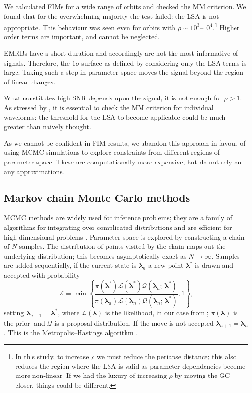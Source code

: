 We calculated FIMs for a wide range of orbits and checked the MM criterion. We found that for the overwhelming majority the test failed: the LSA is not appropriate. This behaviour was seen even for orbits with $\rho \sim 10^3$--$10^4$.\footnote{In this study, to increase $\rho$ we must reduce the periapse distance; this also reduces the region where the LSA is valid as parameter dependencies become more non-linear. If we had the luxury of increasing $\rho$ by moving the GC closer, things could be different.} Higher order terms are important, and cannot be neglected.

EMRBs have a short duration and accordingly are not the most informative of signals. Therefore, the $1\sigma$ surface as defined by considering only the LSA terms is large. Taking such a step in parameter space moves the signal beyond the region of linear changes.

What constitutes high SNR depends upon the signal; it is not enough for $\rho > 1$. As stressed by \citet{Vallisneri2008}, it is essential to check the MM criterion for individual waveforms: the threshold for the LSA to become applicable could be much greater than naively thought.

As we cannot be confident in FIM results, we abandon this approach in favour of using MCMC simulations to explore constraints from different regions of parameter space. These are computationally more expensive, but do not rely on any approximations.

\subsection{Markov chain Monte Carlo methods}\label{sec:MCMC}

MCMC methods are widely used for inference problems; they are a family of algorithms for integrating over complicated distributions and are efficient for high-dimensional problems \citep[chapter 29]{MacKay2003}. Parameter space is explored by constructing a chain of $N$ samples. The distribution of points visited by the chain maps out the underlying distribution; this becomes asymptotically exact as $N \rightarrow \infty$. Samples are added sequentially, if the current state is $\boldsymbol{\lambda}_n$ a new point $\boldsymbol{\lambda}^\ast$ is drawn and accepted with probability
\begin{equation}
\mathcal{A} = \min\left\{\dfrac{\pi(\boldsymbol{\lambda}^\ast)\mathcal{L}(\boldsymbol{\lambda}^\ast)\mathcal{Q}(\boldsymbol{\lambda}_n;\,\boldsymbol{\lambda}^\ast)}{\pi(\boldsymbol{\lambda}_n)\mathcal{L}(\boldsymbol{\lambda}_n)\mathcal{Q}(\boldsymbol{\lambda}_n;\,\boldsymbol{\lambda}^\ast)}, 1\right\},
\end{equation}
setting $\boldsymbol{\lambda}_{n + 1} = \boldsymbol{\lambda}^\ast$, where $\mathcal{L}(\boldsymbol{\lambda})$ is the likelihood, in our case from ; $\pi(\boldsymbol{\lambda})$ is the prior, and $\mathcal{Q}$ is a proposal distribution. If the move is not accepted  $\boldsymbol{\lambda}_{n + 1} = \boldsymbol{\lambda}_n$. This is the Metropolis--Hastings algorithm \citep{Metropolis1953,Hastings1970}.

